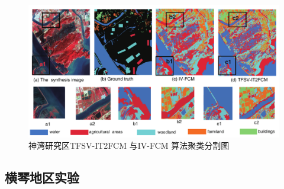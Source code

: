 \begin{figure}[htbp]
    \centering
    \includegraphics[width=1.0\textwidth]{figures/hengqin}
    \caption{神湾研究区TFSV-IT2FCM 与IV-FCM 算法聚类分割图 }\label{fig:hengqin}
\end{figure}

\subsection{横琴地区实验}
\label{subsec::chap04-4-1}

